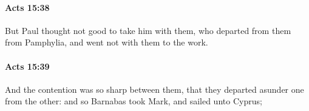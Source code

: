 		\paragraph{Acts 15:38} %
			\label{ACTS-15-38}

			But Paul thought not good to take him with them, who departed from them from Pamphylia, and went not with them to the work.

			\begin{framed}
			\scriptsize
				\begin{compactdesc}
					\item[SBLG] 
				\end{compactdesc}
			\end{framed}

		\paragraph{Acts 15:39} %
			\label{ACTS-15-39}

			And the contention was so sharp between them, that they departed asunder one from the other: and so Barnabas took Mark, and sailed unto Cyprus;

